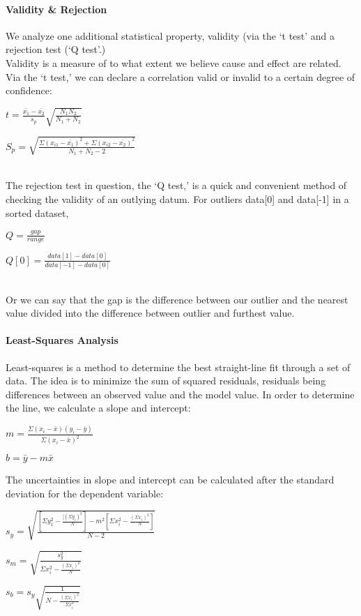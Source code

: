 \documentclass{article}
\begin{document}
   \paragraph{Validity \& Rejection}
    We analyze one additional statistical property, validity
    (via the `t test' and a rejection test (`Q test'.)
    \\
    Validity is a measure of to what extent we believe cause
    and effect are related. Via the `t test,' we can declare
    a correlation valid or invalid to a certain degree of
    confidence: \\
    \begin{center}$t=\frac{\bar{x_1}-\bar{x_2}}{s_p}%
    \sqrt{\frac{N_1N_2}{N_1+N_2}}$\end{center}
    \begin{center}$S_p = \sqrt{\frac{\Sigma (x_{i1}-\bar{x_1})^2 +
    \Sigma(x_{i2}-\bar{x_2})^2}{N_1 + N_2 - 2}}$\end{center}
    \mbox{}\\
    The rejection test in question, the `Q test,' is a quick
    and convenient method of checking the validity of an outlying
    datum. For outliers data[0] and data[-1] in a sorted dataset, \\
    \begin{center}$Q=\frac{gap}{range}$\end{center}
    \begin{center}$Q[0]=\frac{data[1]-data[0]}{data[-1]-data[0]}$\end{center}
    \mbox{}\\
    Or we can say that the gap is the difference between our outlier
    and the nearest value divided into the difference between outlier
    and furthest value.
   \paragraph{Least-Squares Analysis}
    Least-squares is a method to determine the best straight-line fit through a set of data. The idea is to minimize the sum of squared residuals, residuals being differences between an observed value and the model value. In order to determine the line, we calculate a slope and intercept:
    \begin{center}$m = \frac{\Sigma (x_i - \bar{x})(y_i - \bar{y})}{\Sigma (x_i - \bar{x})^2}$\end{center}
    \begin{center}$b = \bar{y} - m \bar{x}$\end{center}
    The uncertainties in slope and intercept can be calculated after the standard deviation for the dependent variable:
    \begin{center}$s_y = \sqrt{\frac{[\Sigma y_1^2 - \frac{[(\Sigma y_i)^2}{N}] - m^2 [\Sigma x_i^2 - \frac{(\Sigma x_i)^2}{N}]}{N-2}}$\end{center}
    \begin{center}$s_m = \sqrt{\frac{s_y^2}{\Sigma x_i^2 - \frac{(\Sigma x_i)^2}{N}}}$\end{center}
    \begin{center}$s_b = s_y \sqrt{\frac{1}{N-\frac{(\Sigma x_i)^2}{\Sigma x_i^2}}}$\end{center}
\end{document}
